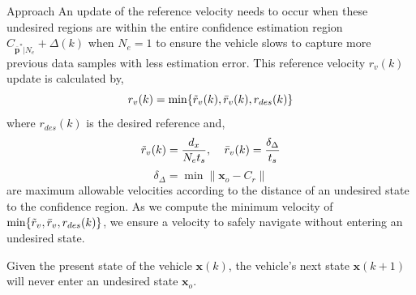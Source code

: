 \begin{section}{Approach}
An update of the reference velocity needs to occur when these undesired regions are within the entire confidence estimation region $ C_{\bar{\bm{p}}^*|N_e}+\Delta(k)$ when $N_e=1$ to ensure the vehicle slows to capture more previous data samples with less estimation error. This reference velocity $r_v(k)$ update is calculated by,
    \begin{equation}
    \label{eq:ref_vel}
        r_v(k) = \min\{\Tilde{r}_v(k), \bar{r}_v(k) ,r_{des}(k)\}
	\end{equation}
where $r_{des}(k)$ is the desired reference and,
	\begin{equation}
	    \Tilde{r}_v(k) = \frac{d_x}{N_et_s}, \;\;\;\; \bar{r}_v(k) = \frac{\delta_{\Delta}}{t_s}
	\end{equation}
	\begin{equation}
	    \delta_{\Delta} = \min \lVert \bm{x}_o - C_r \rVert 
	\end{equation}
are maximum allowable velocities according to the distance of an undesired state to the confidence region. As we compute the minimum velocity of $\min\{\Tilde{r}_v,\bar{r}_v,r_{des}(k)\}$, we ensure a velocity to safely navigate without entering an undesired state.

\begin{lemma} 
	\label{lemma_2}
Given the present state of the vehicle $\bm{x}(k)$, the vehicle's next state $\bm{x}(k+1)$ will never enter an undesired state $\bm{x}_o$.

\end{lemma}


\end{section}
